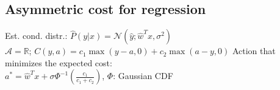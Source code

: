 \subsection*{Asymmetric cost for regression}
	 Est. cond. distr.: $\hat{P}(y|x) = \mathcal{N}(\hat{y};\hat{w}^Tx, \sigma^2)$\\
	 $\mathcal{A} = \mathbb{R}$; $C(y,a) = c_1 \max(y-a,0) + c_2 \max(a-y,0)$
Action that minimizes the expected cost:\\
$a^* = \hat{w}^Tx + \sigma \Phi^{-1} (\frac{c_1}{c_1 + c_2})$, $\Phi$: Gaussian CDF\\
